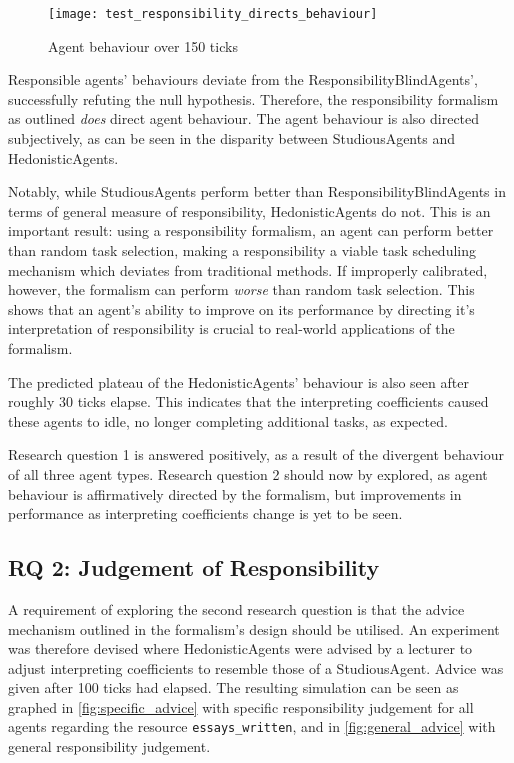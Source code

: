 \begin{figure}[h]
    \centering
    \texttt{[image: test\_responsibility\_directs\_behaviour]}
    \caption{Agent behaviour over 150 ticks}
    \label{fig:behaviour_direction}
\end{figure}

Responsible agents' behaviours deviate from the ResponsibilityBlindAgents', successfully refuting the null hypothesis. Therefore, the responsibility formalism as outlined \emph{does} direct agent behaviour. The agent behaviour is also directed subjectively, as can be seen in the disparity between StudiousAgents and HedonisticAgents.\par

Notably, while StudiousAgents perform better than ResponsibilityBlindAgents in terms of general measure of responsibility, HedonisticAgents do not. This is an important result: using a responsibility formalism, an agent can perform better than random task selection, making a responsibility a viable task scheduling mechanism which deviates from traditional methods. If improperly calibrated, however, the formalism can perform \emph{worse} than random task selection. This shows that an agent's ability to improve on its performance by directing it's interpretation of responsibility is crucial to real-world applications of the formalism.\par

The predicted plateau of the HedonisticAgents' behaviour is also seen after roughly 30 ticks elapse. This indicates that the interpreting coefficients caused these agents to idle, no longer completing additional tasks, as expected.\par

Research question 1 is answered positively, as a result of the divergent behaviour of all three agent types. Research question 2 should now by explored, as agent behaviour is affirmatively directed by the formalism, but improvements in performance as interpreting coefficients change is yet to be seen.\par

\subsection{RQ 2: Judgement of Responsibility}\label{subsec:RQ2}
A requirement of exploring the second research question is that the advice mechanism outlined in the formalism's design should be utilised. An experiment was therefore devised where HedonisticAgents were advised by a lecturer to adjust interpreting coefficients to resemble those of a StudiousAgent. Advice was given after 100 ticks had elapsed. The resulting simulation can be seen as graphed in \cref{fig:specific_advice} with specific responsibility judgement for all agents regarding the resource \texttt{essays\_written}, and in \cref{fig:general_advice} with general responsibility judgement.

